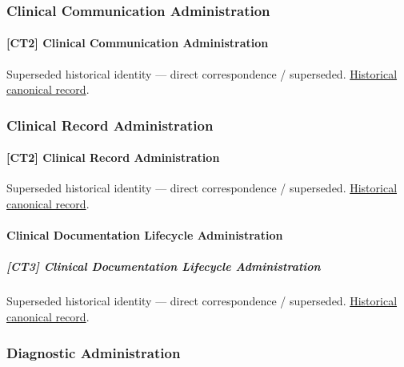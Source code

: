 \subsubsection{Clinical Communication Administration}

\paragraph{[CT2] Clinical Communication Administration}

\par\label{element:bd4d6f4a7f03402ba7857383c7be7a4c}
Superseded historical identity — direct correspondence / superseded. \href{../../../../continuum/strategy/capability/bd4d6f4a7f03402ba7857383c7be7a4c.md}{Historical canonical record}.\par

\subsubsection{Clinical Record Administration}

\paragraph{[CT2] Clinical Record Administration}

\par\label{element:be3f2e695eda403fbce8118daf83d386}
Superseded historical identity — direct correspondence / superseded. \href{../../../../continuum/strategy/capability/be3f2e695eda403fbce8118daf83d386.md}{Historical canonical record}.\par

\paragraph{Clinical Documentation Lifecycle Administration}

\subparagraph{[CT3] Clinical Documentation Lifecycle Administration}

\par\label{element:5b1636373a8d4e788b3ddbc1659a47ef}
Superseded historical identity — direct correspondence / superseded. \href{../../../../continuum/strategy/capability/5b1636373a8d4e788b3ddbc1659a47ef.md}{Historical canonical record}.\par

\subsubsection{Diagnostic Administration}

